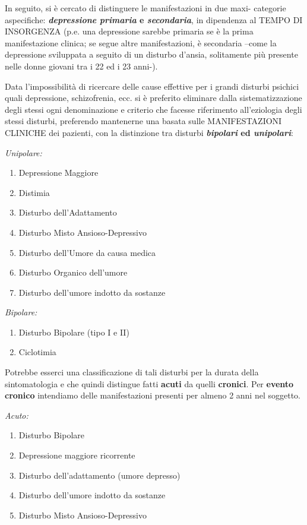 \documentclass[]{article}
\begin{document}
In seguito, si è cercato di distinguere le manifestazioni in due maxi-
categorie aspecifiche: \textbf{\emph{depressione} \emph{primaria} e
\emph{secondaria}}, in dipendenza al TEMPO DI INSORGENZA (p.e. una
depressione sarebbe primaria se è la prima manifestazione clinica; se
segue altre manifestazioni, è secondaria --come la depressione
sviluppata a seguito di un disturbo d'ansia, solitamente più presente
nelle donne giovani tra i 22 ed i 23 anni-).

Data l'impossibilità di ricercare delle cause effettive per i grandi
disturbi psichici quali depressione, schizofrenia, ecc. si è preferito
eliminare dalla sistematizzazione degli stessi ogni denominazione e
criterio che facesse riferimento all'eziologia degli stessi disturbi,
preferendo mantenerne una basata sulle MANIFESTAZIONI CLINICHE dei
pazienti, con la distinzione tra disturbi \textbf{\emph{bipolari} ed
\emph{unipolari}}:

\emph{Unipolare: }

\begin{enumerate}
\def\labelenumi{\arabic{enumi}.}
\item
  Depressione Maggiore
\item
  Distimia
\item
  Disturbo dell'Adattamento
\item
  Disturbo Misto Ansioso-Depressivo
\item
  Disturbo dell'Umore da causa medica
\item
  Disturbo Organico dell'umore
\item
  Disturbo dell'umore indotto da sostanze
\end{enumerate}

\emph{Bipolare:}

\begin{enumerate}
\def\labelenumi{\arabic{enumi}.}
\item
  Disturbo Bipolare (tipo I e II)
\item
  Ciclotimia
\end{enumerate}

Potrebbe esserci una classificazione di tali disturbi per la durata
della sintomatologia e che quindi distingue fatti \textbf{acuti} da
quelli \textbf{cronici}. Per \textbf{evento cronico} intendiamo delle
manifestazioni presenti per almeno 2 anni nel soggetto.

\emph{Acuto:}

\begin{enumerate}
\def\labelenumi{\arabic{enumi}.}
\item
  Disturbo Bipolare
\item
  Depressione maggiore ricorrente
\item
  Disturbo dell'adattamento (umore depresso)
\item
  Disturbo dell'umore indotto da sostanze
\item
  Disturbo Misto Ansioso-Depressivo
\end{enumerate}
\end{document}
